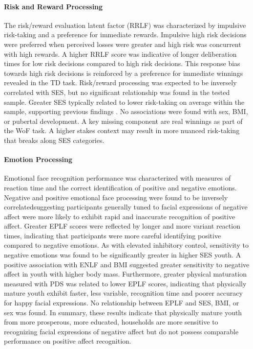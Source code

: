 \documentclass{article}%
\begin{document}
\paragraph*{Risk and Reward Processing} The risk/reward evaluation latent factor (RRLF) was characterized by impulsive risk-taking and a preference for immediate rewards. Impulsive high risk decisions were preferred when perceived losses were greater and high risk was concurrent with high rewards. A higher RRLF score was indicative of longer deliberation times for low risk decisions compared to high risk decisions. This response bias towards high risk decisions is reinforced by a preference for immediate winnings revealed in the TD task. Risk/reward processing was expected to be inversely correlated with SES, but no significant relationship was found in the tested sample. Greater SES typically related to lower risk-taking on average within the sample, supporting previous findings \citep{holmes2019structural}. No associations were found with sex, BMI, or pubertal development. A key missing component are real winnings as part of the WoF task. A higher stakes context may result in more nuanced risk-taking that breaks along SES categories.

\paragraph*{Emotion Processing} Emotional face recognition performance was characterized with measures of reaction time and the correct identification of positive and negative emotions. Negative and positive emotional face processing were found to be inversely correlated\textemdash suggesting participants generally tuned to facial expressions of negative affect were more likely to exhibit rapid and inaccurate recognition of positive affect. Greater EPLF scores were reflected by longer and more variant reaction times, indicating that participants were more careful identifying positive compared to negative emotions. As with elevated inhibitory control, sensitivity to negative emotions was found to be significantly greater in higher SES youth. A positive association with ENLF and BMI suggested greater sensitivity to negative affect in youth with higher body mass. Furthermore, greater physical maturation measured with PDS was related to lower EPLF scores, indicating that physically mature youth exhibit faster, less variable, recognition time and poorer accuracy for happy facial expressions. No relationship between EPLF and SES, BMI, or sex was found. In summary, these results indicate that physically mature youth from more prosperous, more educated, households are more sensitive to recognizing facial expressions of negative affect but do not possess comparable performance on positive affect recognition. 
%
\end{document}
